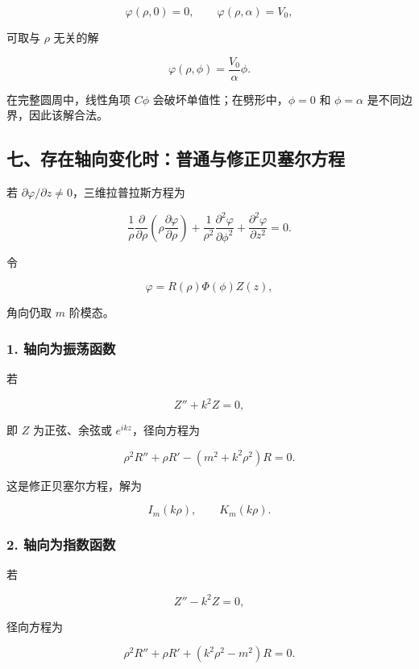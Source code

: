 \[
\varphi(\rho,0)=0,
\qquad
\varphi(\rho,\alpha)=V_0,
\]

可取与 \(\rho\) 无关的解

\[
\boxed{
\varphi(\rho,\phi)
=\frac{V_0}{\alpha}\phi
}.
\]

在完整圆周中，线性角项 \(C\phi\) 会破坏单值性；在劈形中，\(\phi=0\) 和
\(\phi=\alpha\) 是不同边界，因此该解合法。

\subsection{七、存在轴向变化时：普通与修正贝塞尔方程}\label{m2:ux4e03ux5b58ux5728ux8f74ux5411ux53d8ux5316ux65f6ux666eux901aux4e0eux4feeux6b63ux8d1dux585eux5c14ux65b9ux7a0b}

若 \(\partial\varphi/\partial z\ne0\)，三维拉普拉斯方程为

\[
\frac1\rho\frac{\partial}{\partial\rho}
\left(
\rho\frac{\partial\varphi}{\partial\rho}
\right)
+\frac1{\rho^2}
\frac{\partial^2\varphi}{\partial\phi^2}
+\frac{\partial^2\varphi}{\partial z^2}
=0.
\]

令

\[
\varphi=R(\rho)\Phi(\phi)Z(z),
\]

角向仍取 \(m\) 阶模态。

\subsubsection{1.
轴向为振荡函数}\label{m2:ux8f74ux5411ux4e3aux632fux8361ux51fdux6570}

若

\[
Z''+k^2Z=0,
\]

即 \(Z\) 为正弦、余弦或 \(e^{ikz}\)，径向方程为

\[
\boxed{
\rho^2R''+\rho R'
-\left(
m^2+k^2\rho^2
\right)R
=0
}.
\]

这是修正贝塞尔方程，解为

\[
I_m(k\rho),
\qquad
K_m(k\rho).
\]

\subsubsection{2.
轴向为指数函数}\label{m2:ux8f74ux5411ux4e3aux6307ux6570ux51fdux6570}

若

\[
Z''-k^2Z=0,
\]

径向方程为

\[
\boxed{
\rho^2R''+\rho R'
+\left(
k^2\rho^2-m^2
\right)R
=0
}.
\]

